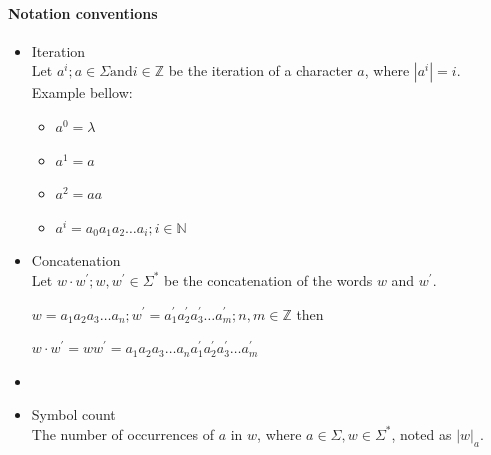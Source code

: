 \paragraph*{Notation conventions}



\begin{itemize}
\item Iteration\\
Let $a^i; a \in \Sigma \text{and} i \in \mathbb{Z}$ be the iteration of a character $a$, where $|a^i| = i$.
Example bellow:


\begin{itemize}
\item $a^0 = \lambda$
\item $a^1 = a$
\item $a^2 = aa$
\item $a^i = a_0 a_1 a_2 \dots a_i; i \in \mathbb{N}$
\end{itemize}



\item Concatenation\\
Let $w \cdot w^{'}; w, w^{'} \in \Sigma^{*}$ be the concatenation of the words $w$ and $w^{'}$.

$w = a_1 a_2 a_3 \dots a_n ; w^{'} = a^{'}_1 a^{'}_2 a^{'}_3 \dots a^{'}_m; n,m \in \mathbb{Z}$ then

$w\cdot w^{'} = w w^{'} = a_1 a_2 a_3 \dots a_n a^{'}_1 a^{'}_2 a^{'}_3 \dots a^{'}_m$


\item {}
\item Symbol count\\
The number of occurrences of $a$ in $w$, where $a \in \Sigma, w \in \Sigma^{*}$, noted as $|w|_{a}$.

\end{itemize}


